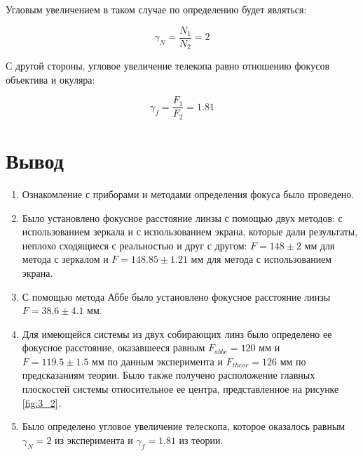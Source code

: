\documentclass[a4paper, 12pt]{article}
\begin{document}
Угловым увеличением в таком случае по определению будет являться:

\begin{equation}
	\gamma_N = \frac{N_1}{N_2} = 2
\end{equation}

С другой стороны, угловое увеличение телекопа равно  отношению фокусов объектива и окуляра:

\begin{equation*}
	\gamma_f = \frac{F_1}{F_2} = 1.81
\end{equation*}


\section{Вывод}

\begin{enumerate}
	\item Ознакомление с приборами и методами определения фокуса было проведено.
	
	\item Было установлено фокусное расстояние линзы с помощью двух методов: с использованием зеркала и с использованием экрана, которые дали результаты, неплохо сходящиеся с реальностью и друг с другом: $F = 148\pm 2$ мм для метода с зеркалом и $F = 148.85 \pm 1.21$ мм для метода с использованием экрана. 
	
	\item С помощью метода Аббе было установлено фокусное расстояние линзы $F = 38.6\pm 4.1$ мм.
	
	\item  Для имеющейся системы из двух собирающих линз было определено ее фокусное расстояние, оказавшееся равным $F_{abbe} = 120 \text{ мм}$ и $F = 119.5\pm 1.5 \text{ мм} $ по данным эксперимента и $F_{theor} = 126 \text{ мм}$ по предсказаниям теории. Было также получено расположение главных плоскостей системы относительное ее центра, представленное на рисунке \ref{fig:3_2}. 
	
	\item Было определено угловое увеличение телескопа, которое оказалось равным $\gamma_N = 2$ из эксперимента и $\gamma_f = 1.81$ из теории. 
\end{enumerate}
\end{document}

